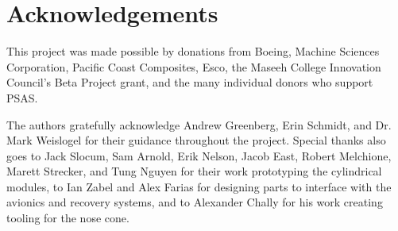 \documentclass{aiaa-tc}%
\begin{document}
\section{Acknowledgements}

This project was made possible by donations from Boeing, Machine Sciences Corporation, Pacific Coast Composites, Esco, the Maseeh College Innovation Council's Beta Project grant, and the many individual donors who support PSAS.

The authors gratefully acknowledge Andrew Greenberg, Erin Schmidt, and Dr. Mark Weislogel for their guidance throughout the project.
Special thanks also goes to Jack Slocum, Sam Arnold, Erik Nelson, Jacob East, Robert Melchione, Marett Strecker, and Tung Nguyen for their work prototyping the cylindrical modules, to Ian Zabel and Alex Farias for designing parts to interface with the avionics and recovery systems, and to Alexander Chally for his work creating tooling for the nose cone.

\end{document}

